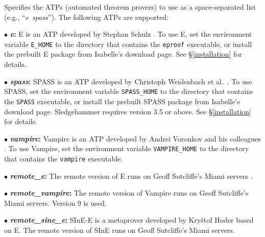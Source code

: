 \documentclass[a4paper,12pt]{article}
\begin{document}
\begin{enum}

Specifies the ATPs (automated theorem provers) to use as a space-separated list
(e.g., ``\textit{e}~\textit{spass}''). The following ATPs are supported:

\begin{enum}
\item[$\bullet$] \textbf{\textit{e}:} E is an ATP developed by Stephan Schulz
\cite{schulz-2002}. To use E, set the environment variable
\texttt{E\_HOME} to the directory that contains the \texttt{eproof} executable,
or install the prebuilt E package from Isabelle's download page. See
\S\ref{installation} for details.

\item[$\bullet$] \textbf{\textit{spass}:} SPASS is an ATP developed by Christoph
Weidenbach et al.\ \cite{weidenbach-et-al-2009}. To use SPASS, set the
environment variable \texttt{SPASS\_HOME} to the directory that contains the
\texttt{SPASS} executable, or install the prebuilt SPASS package from Isabelle's
download page. Sledgehammer requires version 3.5 or above. See
\S\ref{installation} for details.

\item[$\bullet$] \textbf{\textit{vampire}:} Vampire is an ATP developed by
Andrei Voronkov and his colleagues \cite{riazanov-voronkov-2002}. To use
Vampire, set the environment variable \texttt{VAMPIRE\_HOME} to the directory
that contains the \texttt{vampire} executable.

\item[$\bullet$] \textbf{\textit{remote\_e}:} The remote version of E runs
on Geoff Sutcliffe's Miami servers \cite{sutcliffe-2000}.

\item[$\bullet$] \textbf{\textit{remote\_vampire}:} The remote version of
Vampire runs on Geoff Sutcliffe's Miami servers. Version 9 is used.

\item[$\bullet$] \textbf{\textit{remote\_sine\_e}:} SInE-E is a metaprover
developed by Kry\v stof Hoder \cite{sine} based on E. The remote version of
SInE runs on Geoff Sutcliffe's Miami servers.


\end{enum}
\end{enum}
\end{document}
